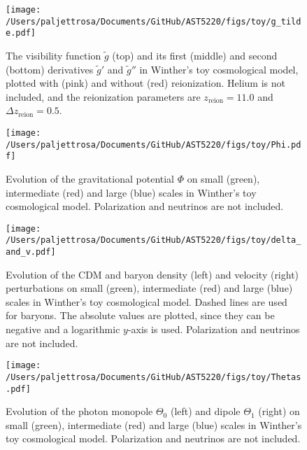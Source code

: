 \documentclass{aa}
\numberwithin{equation}{section}
\numberwithin{table}{section}
\numberwithin{figure}{section}
\begin{document}
\begin{figure}[h!]
  \begin{minipage}{0.5\textwidth}
    \centering
    \texttt{[image: /Users/paljettrosa/Documents/GitHub/AST5220/figs/toy/g\_tilde.pdf]}
    \caption{The visibility function $\tilde{g}$ (top) and its first (middle) and second (bottom) derivatives $\tilde{g}'$ and $\tilde{g}''$ in Winther's toy cosmological model, plotted with (pink) and without (red) reionization. Helium is not included, and the reionization parameters are $z_\text{reion}=11.0$ and $\Delta z_\text{reion}=0.5$.}\label{appfig: g_tilde}
  \end{minipage}
  \begin{minipage}{0.5\textwidth}
    \centering
    \texttt{[image: /Users/paljettrosa/Documents/GitHub/AST5220/figs/toy/Phi.pdf]}
    \caption{Evolution of the gravitational potential $\Phi$ on small (green), intermediate (red) and large (blue) scales in Winther's toy cosmological model. Polarization and neutrinos are not included.}\label{appfig: Phi}
  \end{minipage}
  \vspace{-20pt}
\end{figure}


\begin{figure}[h!]
  \centering
  \texttt{[image: /Users/paljettrosa/Documents/GitHub/AST5220/figs/toy/delta\_and\_v.pdf]}
  \caption{Evolution of the CDM and baryon density (left) and velocity (right) perturbations on small (green), intermediate (red) and large (blue) scales in Winther's toy cosmological model. Dashed lines are used for baryons. The absolute values are plotted, since they can be negative and a logarithmic $y$-axis is used. Polarization and neutrinos are not included.}\label{appfig: delta_and_v}
\end{figure}

\begin{figure}[h!]
  \vspace{5pt}
  \centering
  \texttt{[image: /Users/paljettrosa/Documents/GitHub/AST5220/figs/toy/Thetas.pdf]}
  \caption{Evolution of the photon monopole $\Theta_0$ (left) and dipole $\Theta_1$ (right) on small (green), intermediate (red) and large (blue) scales in Winther's toy cosmological model. Polarization and neutrinos are not included.}\label{appfig: Thetas}
\end{figure}
\end{document}
